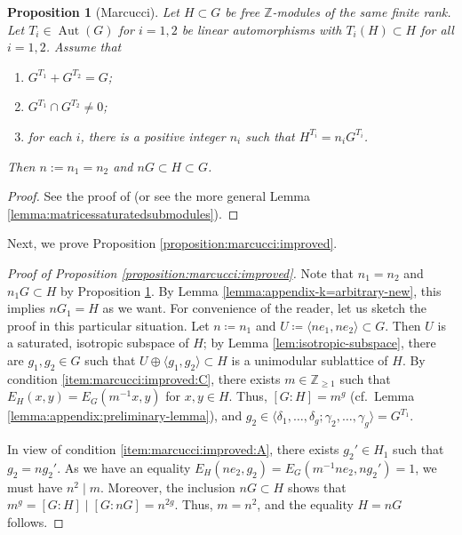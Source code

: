 \documentclass[a4paper,11pt,reqno]{amsart}
\numberwithin{equation}{section}
\theoremstyle{plain}
\newtheorem{proposition}[theorem]{Proposition}
\theoremstyle{definition}
\newcommand{\Z}{\mathbb Z}
\newcommand{\Aut}{\operatorname{Aut}}
\begin{document}
\begin{proposition}[Marcucci]
\label{proposition:marcucci}
Let $H\subset G$ be free $\Z$-modules of the same finite rank. Let $T_i\in \Aut(G)$ for $i=1,2$ be linear automorphisms with $T_i(H)\subset H$ for all $i=1,2$. 
Assume that 
\begin{enumerate}
\item $G^{T_1} + G^{T_2} = G$;
\label{item:marcucci:1}
\item 
\label{item:marcucci:2}
$G^{T_1} \cap G^{T_2} \neq 0$;
\item 
\label{item:marcucci:3}for each $i$, there is a positive integer $n_i$ such that $H^{T_i}=n_iG^{T_i}$. 
\end{enumerate}
Then $n:=n_1 = n_2$ and $n G \subset H \subset G$. 
\end{proposition}
\begin{proof}
    See the proof of \cite[Proposition 3.6]{marcucci-genusofcurves} (or see the more general Lemma \ref{lemma:matricessaturatedsubmodules}). 
\end{proof}

Next, we prove Proposition \ref{proposition:marcucci:improved}. 

\begin{proof}[Proof of Proposition \ref{proposition:marcucci:improved}]
Note that $n_1 = n_2$ and $n_1G \subset H$ by Proposition \ref{proposition:marcucci}. By Lemma \ref{lemma:appendix-k=arbitrary-new}, this implies $nG_1 = H$ as we want. For convenience of the reader, let us sketch the proof in this particular situation. 
Let $n \coloneqq n_1$ and $U \coloneqq \langle ne_1, ne_2 \rangle \subset G$. Then $U$ is a saturated, isotropic subspace of $H$; by Lemma \ref{lem:isotropic-subspace}, there are $g_1, g_2 \in G$ such that $U \oplus \langle g_1, g_2 \rangle \subset H$ is a unimodular sublattice of $H$. By condition \ref{item:marcucci:improved:C}, there exists $m \in \Z_{\geq 1}$ such that $E_H(x,y) = E_G(m^{-1}x,y)$ for $x,y \in H$. Thus, $[G \colon H] = m^g$ (cf.\ Lemma \ref{lemma:appendix:preliminary-lemma}), and $g_2 \in \langle \delta_1, \dotsc, \delta_g; \gamma_2, \dotsc, \gamma_g\rangle = G^{T_1}$. 

In view of condition \ref{item:marcucci:improved:A}, there exists $g_2' \in H_1$ such that $g_2 = n g_2'$. As we have an equality $E_H(ne_2,g_2)=E_G(m^{-1}n e_2, ng_2') = 1$, we must have $n^2 \mid m$. Moreover, the inclusion $nG \subset H$ shows that $ m^g = [G \colon H]  \mid [G \colon nG]= n^{2g}$. Thus, $m =n^2$, and the equality $H = nG$ follows. 
\end{proof}
\end{document}
